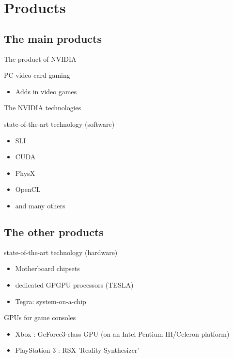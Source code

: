\documentclass{beamer}
\begin{document}
\section{Products}
\subsection{The main products}
\begin{frame}{The product of NVIDIA}
	\transdissolve[duration=0.1]
	\begin{block}{PC video-card gaming}
		\begin{itemize}
			\item<+->{Adds in video games}
		\end{itemize}
	\end{block}
\end{frame}

\begin{frame}{The NVIDIA technologies}
	\transdissolve[duration=0.1]
	\begin{block}{state-of-the-art technology (software)}
		\begin{itemize}
			\item<+->{SLI}
			\item<+->{CUDA}
			\item<+->{PhysX}
			\item<+->{OpenCL}
			\item<+->{and many others}
		\end{itemize}
	\end{block}
\end{frame}

\subsection{The other products}
\begin{frame}{}
	\transdissolve[duration=0.1]
	\begin{block}{state-of-the-art technology (hardware)}
		\begin{itemize}
			\item<+->{Motherboard chipsets}
			\item<+->{dedicated GPGPU processors (TESLA)}
			\item<+->{Tegra: system-on-a-chip}
		\end{itemize}
	\end{block}
	\begin{block}{GPUs for game consoles}
		\begin{itemize}
			\item<+->{Xbox : GeForce3-class GPU (on an Intel Pentium III/Celeron platform)}
			\item<+->{PlayStation 3 : RSX 'Reality Synthesizer'}
		\end{itemize}
	\end{block}
\end{frame}
\end{document}

